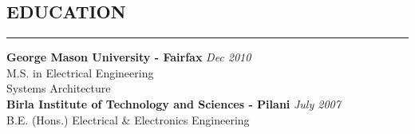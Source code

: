 \documentclass{article}
\begin{document}
%
\subsection*{\MakeUppercase{\bf Education}}
    \hrule
    \bigskip
    {\bf George Mason University - Fairfax} \hfill {\em Dec 2010} \\ 
    M.S. in Electrical Engineering \\
    Systems Architecture \bigskip \\

    {\bf Birla Institute of Technology and Sciences - Pilani}
    \hfill {\em July 2007} \\ 
    B.E. (Hons.) Electrical \& Electronics Engineering \bigskip \\
\end{document}
